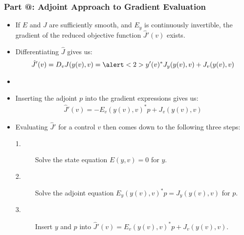 \documentclass[9pt]{beamer}
\makeatletter
\newcommand*{\rom}[1]{\expandafter\@slowromancap\romannumeral #1@}
\makeatother
\begin{document}
\begin{frame}
\frametitle{\textbf{ Part \rom{2}:} Adjoint Approach to Gradient Evaluation}
\begin{itemize}
\item<1->{If $E$ and $J$ are sufficiently smooth, and $E_y$ is continuously invertible, the gradient of the reduced objective function $\hat J'(v)$ exists.}
\item<1->{Differentiating $\hat J$ gives us: 
\begin{align*}
\hat J'(v)=D_vJ(y(v),v)=\alert<2>{y'(v)^*}J_y(y(v),v)+J_v(y(v),v)
\end{align*}}
\item<3->{ 
}
\item<7->{Inserting the adjoint $p$ into the gradient expressions gives us:
\begin{align*}
\hat J'(v) = -E_v(y(v),v)^*p+J_v(y(v),v)
\end{align*}}
\item<8->{Evaluating $\hat J'$ for a control $v$ then comes down to the following three steps:
\begin{description}
\item[1.]{Solve the state equation $E(y,v)=0$ for $y$.}
\item[2.]{Solve the adjoint equation $E_y(y(v),v)^*p = J_y(y(v),v)$ for $p$.}
\item[3.]{Insert $y$ and $p$ into $\hat J'(v)=E_v(y(v),v)^*p +J_v(y(v),v)$.}
\end{description}}
\end{itemize}
\end{frame}
\end{document}
